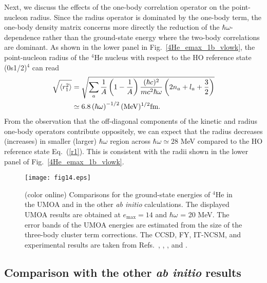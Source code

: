 \documentclass[aps,prc, dvips, twocolumn,groupedaddress,showkeys,showpacs,floatfix,superscriptaddress]{revtex4-1}
\newcommand{\<}{\langle}
\renewcommand{\>}{\rangle}
\begin{document}
Next, we discuss the effects of the one-body correlation operator on the point-nucleon radius.
Since the radius operator is dominated by the one-body term,
the one-body density matrix concerns more directly the reduction of the
 $\hbar\omega$-dependence rather than the ground-state energy where the two-body correlations are dominant.
As shown in the lower panel in Fig.~\ref{4He_emax_1b_vlowk},
the point-nucleon radius of the $^{4}$He nucleus
with respect to the HO reference state (0s1/2)$^{4}$ can read
\begin{align}
  \sqrt{\< r^{2}_{1}\>}  &=
  \sqrt{\sum_{a}\frac{1}{A}\left(1 - \frac{1}{A}\right) \frac{(\hbar c)^{2}}
  {mc^{2} \hbar\omega} \left(2n_{a} + l_{a} + \frac{3}{2}\right)} \notag \\
  \label{r1}
  &\simeq 6.8 \left( \hbar\omega \right)^{-1/2} ({\rm MeV})^{1/2} {\rm fm}.
\end{align}
From the observation that the off-diagonal components of the kinetic and radius one-body operators contribute oppositely,
 we can expect that the radius decreases (increases) in smaller (larger) $\hbar\omega$ region across $\hbar\omega \simeq 28$ MeV
 compared to the HO reference state Eq.~(\ref{r1}).
This is consistent with the radii shown in the lower panel of Fig.~\ref{4He_emax_1b_vlowk}.

\begin{figure}[t!]
\texttt{[image: fig14.eps]}
\caption{\label{4He_final} (color online) Comparisons for the ground-state
 energies of $^{4}$He in the UMOA and in the other {\it ab initio} calculations.
 The displayed UMOA results are obtained at $e_{\max} = 14$ and $\hbar\omega$ = 20 MeV.
 The error bands of the UMOA energies are estimated from the size of the three-body cluster term corrections.
 The CCSD, FY, IT-NCSM, and experimental results are taken from Refs.~\cite{Hagen:2007},
 \cite{Nogga:2004, Hagen:2007}, \cite{Roth:2011}, and \cite{Wang:2012}.}
\end{figure}


\subsection{Comparison with the other {\it ab initio} results}
\end{document}
